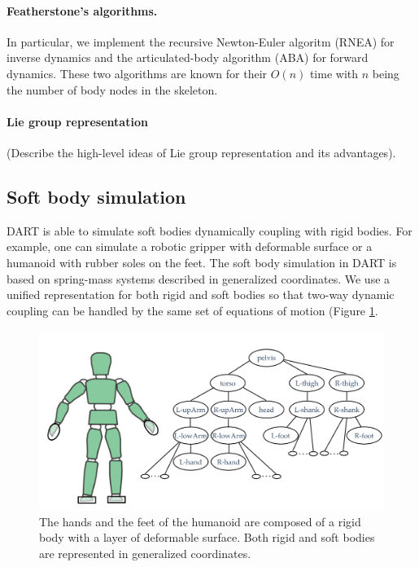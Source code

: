 \paragraph{Featherstone's algorithms.} In particular, we implement the
recursive Newton-Euler algoritm (RNEA) for inverse dynamics and the
articulated-body algorithm (ABA) for forward dynamics. These two
algorithms are known for their $O(n)$ time with $n$ being the number of
body nodes in the skeleton. 

\paragraph{Lie group representation}
 (Describe the high-level ideas of Lie group representation and its advantages).

\subsection{Soft body simulation}
DART is able to simulate soft bodies dynamically coupling with rigid
bodies. For example, one can simulate a robotic gripper with deformable
surface or a humanoid with rubber soles on the feet. The soft body
simulation in DART is based on spring-mass systems described in
generalized coordinates. We use a unified representation for both
rigid and soft bodies so that two-way dynamic coupling can be handled
by the same set of equations of motion (Figure \ref{fig:softbody}. 

\begin{figure}
\centering
\includegraphics[width=6.0in]{fig/soft-body.jpg}
\caption{The hands and the feet of the humanoid are composed of a
  rigid body with a layer of deformable surface. Both rigid and soft
  bodies are represented in generalized coordinates.}
\label{fig:softbody}
\end{figure}

